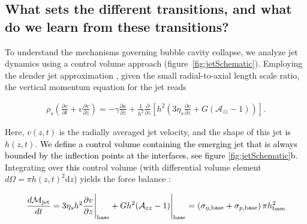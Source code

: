 \documentclass{jfm}
\newcommand{\AO}[1]{{\textcolor{black}{#1}}}
\begin{document}
\subsection{What sets the different transitions, and what do we learn from these transitions?}
\label{app:elasticeffects}

To understand the mechanisms governing bubble cavity collapse, we analyze jet dynamics using a control volume approach (figure~\ref{fig:jetSchematic}). Employing the slender jet approximation \citep{shi1994cascade, eggers2015singularities,driessen2013stability}, given the small radial-to-axial length scale ratio, the vertical momentum equation for the jet reads

\begin{align}
	\rho_s \left(	\frac{\partial v}{\partial t} + v\frac{\partial v}{\partial z} \right) = - \gamma \frac{\partial \kappa} {\partial z} + \frac{1}{h^2} \frac{\partial}{\partial z}\left[ h^2 \left( 3\eta_s \frac{\partial v}{\partial z} + G\left(\mathcal{A}_{zz}-1\right) \right) \right].
	\label{slenderjet}
\end{align}

\noindent Here, $v(z,t)$ is the radially averaged jet velocity, and the shape of this jet is $h(z,t)$. \AO{We define a control volume containing the emerging jet that is always bounded by the inflection points at the interfaces, see figure \ref{fig:jetSchematic}b}. Integrating over \AO{this} control volume (with differential volume element $d\Omega = \pi h(z,t)^2\mathrm{d}z$) yields the force balance \citep{trouton1906coefficient}:

\begin{align}
	\frac{d \mathcal{M}_{\text{jet}}}{d t} = 3 \eta_sh^2\frac{\partial v}{\partial z}\Bigg|_{\text{base}} + Gh^2(\mathcal{A}_{zz}-1)\Bigg|_{\text{base}} = \AO{\left(\sigma_{\eta,\text{base}} + \sigma_{p,\text{base}}\right)\pi h_{\text{base}}^2}
	\label{forcebalance}
\end{align}
\end{document}
